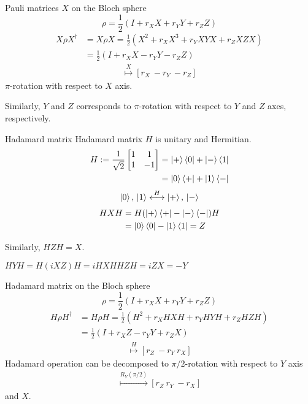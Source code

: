 \documentclass{beamer}
\begin{document}
\begin{frame}{Pauli matrices $X$ on the Bloch sphere}
\begin{equation*}
\rho = \frac12\left(I + r_X X + r_Y Y + r_Z Z\right)
\end{equation*}
\begin{align*}
X\rho X^\dagger &= X\rho X =  \frac12\left(X^2 + r_X X^3 + r_Y XYX + r_Z XZX\right)\\
&=  \frac12\left(I + r_X X - r_Y Y - r_Z Z\right)
\end{align*}
\begin{align*}
[r_X\ r_Y\ r_Z]\overset{X}{\longmapsto} [r_X\ -r_Y\ -r_Z]
\end{align*}
$\pi$-rotation with respect to $X$ axis.

\vspace{1em}
Similarly, $Y$ and $Z$ corresponds to $\pi$-rotation with respect to $Y$ and $Z$ axes, respectively.
\end{frame}

\begin{frame}{Hadamard matrix}
Hadamard matrix $H$ is unitary and Hermitian.
\begin{align*}
H:=\frac1{\sqrt{2}}\begin{bmatrix}1&1\\1&-1\end{bmatrix}
&=\ket{+}\bra{0}+\ket{-}\bra{1}\\
&=\ket{0}\bra{+}+\ket{1}\bra{-}
\end{align*}
\begin{align*}
\ket{0},\,\ket{1} \overset{H}{\longleftrightarrow} \ket{+},\,\ket{-}
\end{align*}
\begin{align*}
HXH &= H(\ket{+}\bra{+}-\ket{-}\bra{-})H\\
&= \ket{0}\bra{0}-\ket{1}\bra{1} = Z
\end{align*}

Similarly, $HZH=X$.

$HYH=H(iXZ)H =i HXH HZH = i Z X= - Y$
\end{frame}

\begin{frame}{Hadamard matrix on the Bloch sphere}
\begin{equation*}
\rho = \frac12\left(I + r_X X + r_Y Y + r_Z Z\right)
\end{equation*}
\begin{align*}
H\rho H^\dagger &= H\rho H =  \frac12\left(H^2 + r_X HXH + r_Y HYH + r_Z HZH\right)\\
&=  \frac12\left(I + r_X Z - r_Y Y + r_Z X\right)
\end{align*}
\begin{align*}
[r_X\ r_Y\ r_Z]\overset{H}{\longmapsto} [r_Z\ -r_Y\ r_X]
\end{align*}
Hadamard operation can be decomposed to $\pi/2$-rotation with respect to $Y$ axis
\begin{align*}
[r_X\ r_Y\ r_Z]\overset{R_Y(\pi/2)}{\longmapsto} [r_Z\ r_Y\ -r_X]
\end{align*}
and $X$.
\end{frame}
\end{document}
